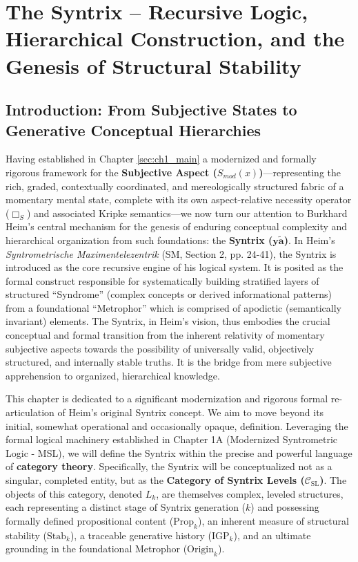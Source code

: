 \documentclass[
    12pt,              %
    a4paper,           %
    headings=normal,   %
    twoside=true,      %
    BCOR=8mm,          %
]{scrbook}
\newcommand{\q}[1]{\enquote{#1}}
\newcommand{\syntrix}{\bm{y\widetilde{a}}}
\newcommand{\BoxS}{\Box_S}
\newcommand{\Propk}[1]{\text{Prop}_{#1}}
\newcommand{\Stabk}[1]{\text{Stab}_{#1}}
\newcommand{\IGPk}[1]{\text{IGP}_{#1}}
\newcommand{\Origink}[1]{\text{Origin}_{#1}}
\begin{document}
\chapter{The Syntrix – Recursive Logic, Hierarchical Construction, and the Genesis of Structural Stability}
\label{sec:ch2_main}

\section{Introduction: From Subjective States to Generative Conceptual Hierarchies}
\label{sec:ch2_intro} 

Having established in Chapter \ref{sec:ch1_main} a modernized and formally rigorous framework for the \textbf{Subjective Aspect (\(S_{mod}(x)\))}—representing the rich, graded, contextually coordinated, and mereologically structured fabric of a momentary mental state, complete with its own aspect-relative necessity operator (\(\BoxS\)) and associated Kripke semantics—we now turn our attention to Burkhard Heim's central mechanism for the genesis of enduring conceptual complexity and hierarchical organization from such foundations: the \textbf{Syntrix (\(\syntrix\))}. In Heim's \textit{Syntrometrische Maximentelezentrik} (SM, Section 2, pp. 24-41), the Syntrix is introduced as the core recursive engine of his logical system. It is posited as the formal construct responsible for systematically building stratified layers of structured \q{Syndrome} (complex concepts or derived informational patterns) from a foundational \q{Metrophor} which is comprised of apodictic (semantically invariant) elements. The Syntrix, in Heim's vision, thus embodies the crucial conceptual and formal transition from the inherent relativity of momentary subjective aspects towards the possibility of universally valid, objectively structured, and internally stable truths. It is the bridge from mere subjective apprehension to organized, hierarchical knowledge.

This chapter is dedicated to a significant modernization and rigorous formal re-articulation of Heim's original Syntrix concept. We aim to move beyond its initial, somewhat operational and occasionally opaque, definition. Leveraging the formal logical machinery established in Chapter 1A (Modernized Syntrometric Logic - MSL), we will define the Syntrix within the precise and powerful language of \textbf{category theory}. Specifically, the Syntrix will be conceptualized not as a singular, completed entity, but as the \textbf{Category of Syntrix Levels (\(\mathcal{C}_{\text{SL}}\))}. The objects of this category, denoted \(L_k\), are themselves complex, leveled structures, each representing a distinct stage of Syntrix generation (\(k\)) and possessing formally defined propositional content (\(\Propk{k}\)), an inherent measure of structural stability (\(\Stabk{k}\)), a traceable generative history (\(\IGPk{k}\)), and an ultimate grounding in the foundational Metrophor (\(\Origink{k}\)).
\end{document}
